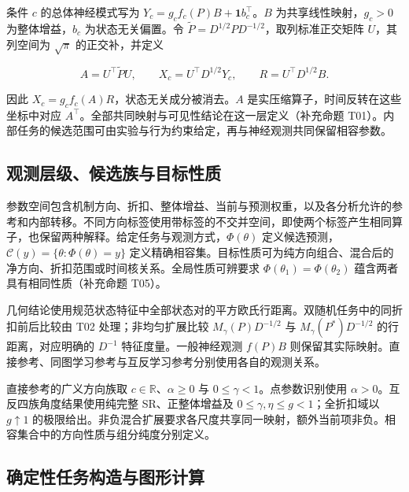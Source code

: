 \documentclass[11pt,a4paper]{article}
\begin{document}
\par
\noindent\begin{minipage}{\linewidth}

条件 \(c\) 的总体神经模式写为 \(Y_c=g_cf_c(P)B+\mathbf1b_c^\top\)。\(B\)
为共享线性映射，\(g_c>0\) 为整体增益，\(b_c\) 为状态无关偏置。令
\(\widetilde P=D^{1/2}PD^{-1/2}\)，取列标准正交矩阵 \(U\)，其列空间为
\(\sqrt\pi\) 的正交补，并定义

\[
A=U^\top\widetilde P U,\qquad
X_c=U^\top D^{1/2}Y_c,\qquad
R=U^\top D^{1/2}B.
\]

\end{minipage}\par

因此 \(X_c=g_cf_c(A)R\)，状态无关成分被消去。\(A\)
是实压缩算子，时间反转在这些坐标中对应
\(A^\top\)。全部共同映射与可见性结论在这一层定义（补充命题
T01）。内部任务的候选范围可由实验与行为约束给定，再与神经观测共同保留相容参数。

\subsection{观测层级、候选族与目标性质}\label{ux89c2ux6d4bux5c42ux7ea7ux5019ux9009ux65cfux4e0eux76eeux6807ux6027ux8d28}

参数空间包含机制方向、折扣、整体增益、当前与预测权重，以及各分析允许的参考和内部转移。不同方向标签使用带标签的不交并空间，即使两个标签产生相同算子，也保留两种解释。给定任务与观测方式，\(\Phi(\theta)\)
定义候选预测，\(\mathcal C(y)=\{\theta:\Phi(\theta)=y\}\)
定义精确相容集。目标性质可为纯方向组合、混合后的净方向、折扣范围或时间核关系。全局性质可辨要求
\(\Phi(\theta_1)=\Phi(\theta_2)\) 蕴含两者具有相同性质（补充命题 T05）。

几何结论使用规范状态特征中全部状态对的平方欧氏行距离。双随机任务中的同折扣前后比较由
T02 处理；非均匀扩展比较 \(M_\gamma(P)D^{-1/2}\) 与
\(M_\gamma(P^*)D^{-1/2}\) 的行距离，对应明确的 \(D^{-1}\)
特征度量。一般神经观测 \(f(P)B\)
则保留其实际映射。直接参考、同图学习参考与互反学习参考分别使用各自的观测关系。

直接参考的广义方向族取 \(c\in\mathbb R\)、\(\alpha\geq0\) 与
\(0\leq\gamma<1\)。点参数识别使用
\(\alpha>0\)。互反四族角度结果使用纯完整 SR、正整体增益及
\(0\leq\gamma,\eta\leq g<1\)；全折扣域以 \(g\uparrow1\)
的极限给出。非负混合扩展要求各尺度共享同一映射，额外当前项非负。相容集合中的方向性质与组分纯度分别定义。

\subsection{确定性任务构造与图形计算}\label{ux786eux5b9aux6027ux4efbux52a1ux6784ux9020ux4e0eux56feux5f62ux8ba1ux7b97}
\end{document}
